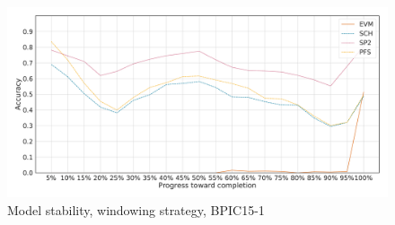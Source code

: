 \begin{figure}[!htb]
    \centering
    \includegraphics[width=\textwidth]{gfx/bpic2015_1/windowed_stability.pdf}
    \caption{Model stability, windowing strategy, BPIC15-1}
    \label{fig:bpic15-1-windowed-stability}
\end{figure}

\FloatBarrier
